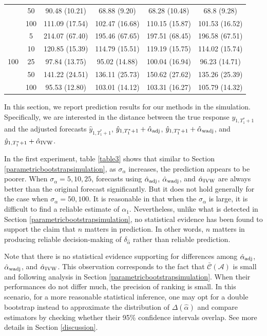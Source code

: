 \documentclass[11pt]{article}
\def\mc#1{\mathcal{#1}} %
\theoremstyle{definition}
\begin{document}
\begin{table}[t]
\begin{center}
\begin{tabular}{cc|cccc}
     & 50  & 90.48 (10.21) & 68.88 (9.20) & 68.28 (10.48) & 68.8 (9.28) \\ 
     & 100  & 111.09 (17.54) & 102.47 (16.68) & 110.15 (15.87) & 101.53 (16.52) \\[.3cm] 
   \multirow{5}{*}{100}  & 5  & 214.07 (67.40) & 195.46 (67.65) & 197.51 (68.45) & 196.58 (67.51) \\ 
     & 10  & 120.85 (15.39) & 114.79 (15.51) & 119.19 (15.75) & 114.02 (15.74) \\ 
     & 25  & 97.84 (13.75) & 95.02 (14.88) & 100.04 (16.94) & 96.23 (14.71) \\ 
     & 50  & 141.22 (24.51) & 136.11 (25.73) & 150.62 (27.62) & 135.26 (25.39) \\ 
     & 100  & 95.53 (12.80) & 103.01 (14.12) & 103.31 (16.27) & 105.79 (14.32) \\
\end{tabular}	
 \end{center}
  \vspace{-.5cm}
\end{table}



In this section, we report prediction results for our methods in the simulation. Specifically, we are interested in the distance between the true response $y_{1,T_1^*+1}$ and the adjusted forecasts $\hat{y}_{1,T_1^*+1}$, $\hat{y}_{1,T_1^*+1}+ \hat{\alpha}_{\rm adj}$, $\hat{y}_{1,T_1^*+1}+\hat{\alpha}_{\rm wadj}$, and $\hat{y}_{1,T_1^*+1}+\hat{\alpha}_{\rm IVW}$.

In the first experiment, table \ref{table3} shows that similar to Section \ref{parametricbootstrapsimulation}, as $\sigma_{\alpha}$ increases, the prediction appears to be poorer. When $\sigma_{\alpha}= 5, 10, 25$, forecasts using $\hat{\alpha}_{\rm adj}$, $\hat{\alpha}_{\rm wadj}$, and $\hat{\alpha}_{\rm IVW}$ are always better than the original forecast significantly. But it does not hold generally for the case when $\sigma_{\alpha}=50, 100$. It is reasonable in that when the $\sigma_{\alpha}$ is large, it is difficult to find a reliable estimate of $\alpha_1$.  Nevertheless, unlike what is detected in Section \ref{parametricbootstrapsimulation}, no statistical evidence has been found to support the claim that $n$ matters in prediction. In other words, $n$ matters in producing reliable decision-making of $\delta_{\hat{\alpha}}$  rather than reliable prediction. 

Note that there is no statistical evidence supporting for differences among $\hat{\alpha}_{\rm adj}$, $\hat{\alpha}_{\rm wadj}$, and $\hat{\alpha}_{\rm IVW}$. This observation corresponds to the fact that $\bar{\mc{C}}(\mc{A})$ is small and following analysis in Section \ref{parametricbootstrapsimulation}. When their performances do not differ much, the precision of ranking is small. In this scenario, for a more reasonable statistical inference, one may opt for a double bootstrap instead to approximate the distribution of $\Delta(\hat{\alpha})$ and compare estimators by checking whether their 95\% confidence intervals overlap. See more details in Section \ref{discussion}. 
\end{document}
